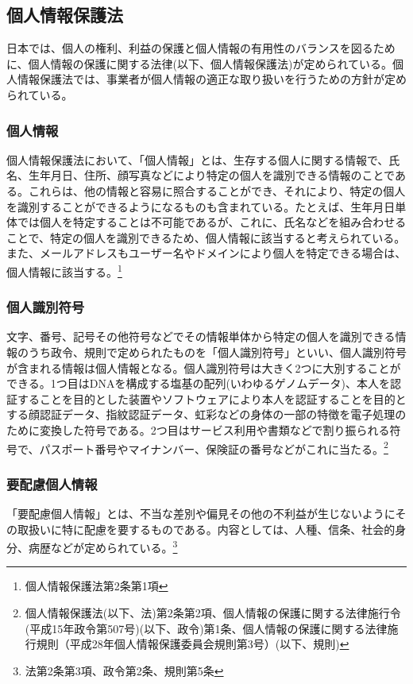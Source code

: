 \subsection{個人情報保護法}
日本では、個人の権利、利益の保護と個人情報の有用性のバランスを図るために、個人情報の保護に関する法律(以下、個人情報保護法)が定められている。個人情報保護法では、事業者が個人情報の適正な取り扱いを行うための方針が定められている。
\subsubsection{個人情報}
個人情報保護法において、「個人情報」とは、生存する個人に関する情報で、氏名、生年月日、住所、顔写真などにより特定の個人を識別できる情報のことである。これらは、他の情報と容易に照合することができ、それにより、特定の個人を識別することができるようになるものも含まれている。たとえば、生年月日単体では個人を特定することは不可能であるが、これに、氏名などを組み合わせることで、特定の個人を識別できるため、個人情報に該当すると考えられている。また、メールアドレスもユーザー名やドメインにより個人を特定できる場合は、個人情報に該当する。\footnote{個人情報保護法第2条第1項}\cite{個人情報保護法16:online}
\subsubsection{個人識別符号}
文字、番号、記号その他符号などでその情報単体から特定の個人を識別できる情報のうち政令、規則で定められたものを「個人識別符号」といい、個人識別符号が含まれる情報は個人情報となる。個人識別符号は大きく2つに大別することができる。1つ目はDNAを構成する塩基の配列(いわゆるゲノムデータ)、本人を認証することを目的とした装置やソフトウェアにより本人を認証することを目的とする顔認証データ、指紋認証データ、虹彩などの身体の一部の特徴を電子処理のために変換した符号である。2つ目はサービス利用や書類などで割り振られる符号で、パスポート番号やマイナンバー、保険証の番号などがこれに当たる。\footnote{個人情報保護法(以下、法)第2条第2項、個人情報の保護に関する法律施行令(平成15年政令第507号)(以下、政令)第1条、個人情報の保護に関する法律施行規則（平成28年個人情報保護委員会規則第3号）(以下、規則)}
\subsubsection{要配慮個人情報}
「要配慮個人情報」とは、不当な差別や偏見その他の不利益が生じないようにその取扱いに特に配慮を要するものである。内容としては、人種、信条、社会的身分、病歴などが定められている。\footnote{法第2条第3項、政令第2条、規則第5条}
